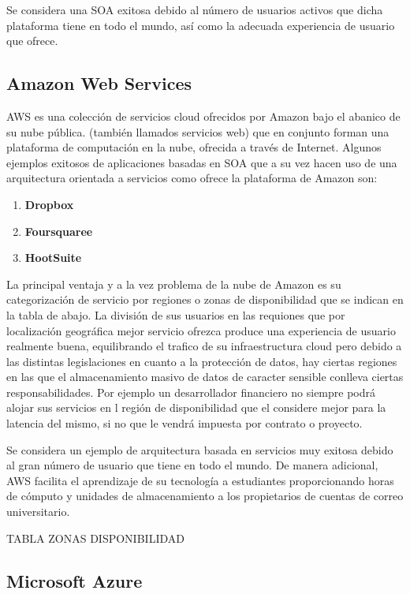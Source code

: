 \documentclass[a4paper,11pt]{book}
\begin{document}
Se considera una SOA exitosa debido al número de usuarios activos que dicha plataforma tiene en todo el mundo, así como la adecuada experiencia de usuario que ofrece. 

\subsection{Amazon Web Services}

AWS es una colección de servicios cloud ofrecidos por Amazon bajo el abanico de su nube pública.  (también llamados servicios web) que en conjunto forman una plataforma de computación en la nube, ofrecida a través de Internet. Algunos ejemplos exitosos de aplicaciones basadas en SOA que a su vez hacen uso de una arquitectura orientada a servicios como ofrece la plataforma de Amazon son:

\begin{enumerate}
\item \textbf{Dropbox}
\item \textbf{Foursquaree}
\item \textbf{HootSuite}
\end{enumerate}

La principal ventaja y a la vez problema de la nube de Amazon es su categorización de servicio por regiones o zonas de disponibilidad que se indican en la tabla de abajo. La división de sus usuarios en las requiones que por localización geográfica mejor servicio ofrezca produce una experiencia de usuario realmente buena, equilibrando el trafico de su infraestructura cloud pero debido a las distintas legislaciones en cuanto a la protección de datos, hay ciertas regiones en las que el almacenamiento masivo de datos de caracter sensible conlleva ciertas responsabilidades. Por ejemplo un desarrollador financiero no siempre podrá alojar sus servicios en l región de disponibilidad que el considere mejor para la latencia del mismo, si no que le vendrá impuesta por contrato o proyecto. 

Se considera un ejemplo de arquitectura basada en servicios muy exitosa debido al gran número de usuario que tiene en todo el mundo. De manera adicional, AWS facilita el aprendizaje de su tecnología a estudiantes proporcionando horas de cómputo y unidades de almacenamiento a los propietarios de cuentas de correo universitario. 

TABLA ZONAS DISPONIBILIDAD

\subsection{Microsoft Azure}
\end{document}
